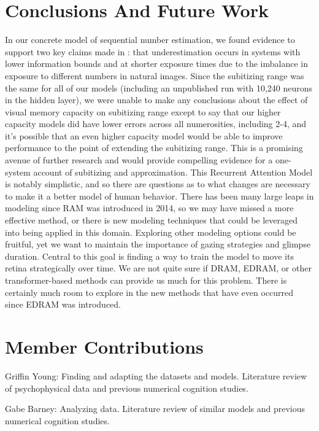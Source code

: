 \documentclass{article}
\begin{document}
\section{Conclusions And Future Work}
In our concrete model of sequential number estimation, we found evidence to support two key claims made in \cite{unified}: that underestimation occurs in systems with lower information bounds and at shorter exposure times due to the imbalance in exposure to different numbers in natural images. Since the subitizing range was the same for all of our models (including an unpublished run with 10,240 neurons in the hidden layer), we were unable to make any conclusions about the effect of visual memory capacity on subitizing range except to say that our higher capacity models did have lower errors across all numerosities, including 2-4, and it's possible that an even higher capacity model would be able to improve performance to the point of extending the subitizing range. This is a promising avenue of further research and would provide compelling evidence for a one-system account of subitizing and approximation.\newline
This Recurrent Attention Model is notably simplistic, and so there are questions as to what changes are necessary to make it a better model of human behavior. There has been many large leaps in modeling since RAM was introduced in 2014, so we may have missed a more effective method, or there is new modeling techniques that could be leveraged into being applied in this domain. Exploring other modeling options could be fruitful, yet we want to maintain the importance of gazing strategies and glimpse duration. Central to this goal is finding a way to train the model to move its retina strategically over time. We are not quite sure if DRAM, EDRAM, or other transformer-based methods can provide us much for this problem. There is certainly much room to explore in the new methods that have even occurred since EDRAM was introduced.


\section{Member Contributions}

Griffin Young: Finding and adapting the datasets and models. Literature review of psychophysical data and previous numerical cognition studies.

Gabe Barney: Analyzing data. Literature review of similar models and previous numerical cognition studies.



\end{document}
